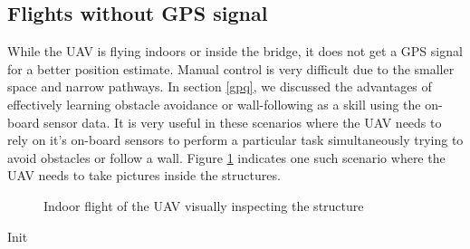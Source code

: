 \documentclass[12pt]{report}
\begin{document}
\subsection{Flights without GPS signal}
While the UAV is flying indoors or inside the bridge, it does not get a GPS signal for a better position estimate. Manual control is very difficult due to the smaller space and narrow pathways. In section \ref{gpq}, we discussed the advantages of effectively learning obstacle avoidance or wall-following as a skill using the on-board sensor data. It is very useful in these scenarios where the UAV needs to rely on it's on-board sensors to perform a particular task simultaneously trying to avoid obstacles or follow a wall. Figure \ref{fig:indoor_flight} indicates one such scenario where the UAV needs to take pictures inside the structures.
\begin{figure}[htp]
	\centering 
	\caption{Indoor flight of the UAV visually inspecting the structure}
   \label{fig:indoor_flight}
\end{figure}
Init
\end{document}
